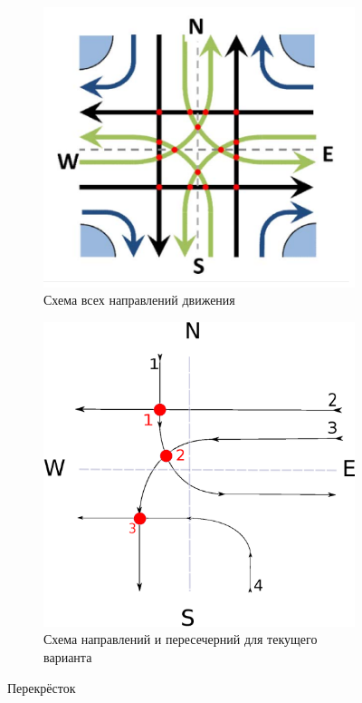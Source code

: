 \documentclass[a4papaer,12pt]{article}
\begin{document}
\begin{figure}[h!]
    \begin{subfigure}[b]{.49\linewidth}
    \includegraphics[width=\linewidth]{crossroad.png}
    \caption{Схема всех направлений движения}
    \end{subfigure}
    \begin{subfigure}[b]{.45\linewidth}
    \includegraphics[width=\linewidth]{scheme.eps}
    \caption{Схема направлений и пересечерний для текущего варианта}
    \end{subfigure}
    \caption{Перекрёсток}
    \label{fig:1}
\end{figure}
\end{document}
